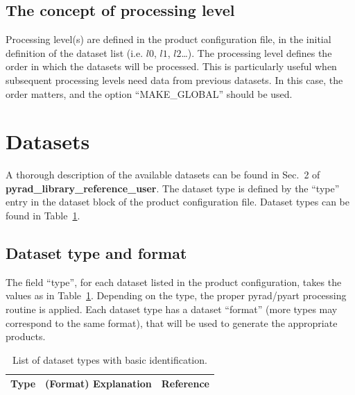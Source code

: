\documentclass[a4paper,11pt,pdftex,twoside]{scrartcl}
\renewcommand{\bf}{\normalfont \bfseries}
\begin{document}
{{{\subsection{The concept of processing level}

Processing level(s) are defined in the product configuration file, in  the initial definition of the dataset list (i.e. $l0$, $l1$, $l2$\dots). The processing level defines the order in which the datasets
will be processed. This is particularly useful when subsequent processing levels need data from previous datasets. In this case, the order matters, and the option ``MAKE\_GLOBAL'' should be used.

\newpage

\section{Datasets}
\label{sec_datasets}
A thorough description of the available datasets can be found in Sec.~2 of {\bf pyrad\_library\_reference\_user}. The dataset type is defined by the ``type'' entry in the
dataset block of the product configuration file. Dataset types can be found in Table~\ref{tab_datasets_type}.

\subsection{Dataset type and format}

 The field ``type'', for each dataset listed in the product configuration, takes the values as in
Table~\ref{tab_datasets_type}. Depending on the type, the proper pyrad/pyart processing routine is
applied. Each dataset type has a dataset ``format'' (more types may correspond to the same format),
that will be used to generate the appropriate products.


\begin{longtable}{p{}p{}p{}}
\caption{List of dataset types with basic identification.}\\
\label{tab_datasets_type}
\bf{Type}          & \bf{(Format) Explanation} & \bf{Reference}\\
\hline
\endfirsthead


\end{longtable}}}}
\end{document}
